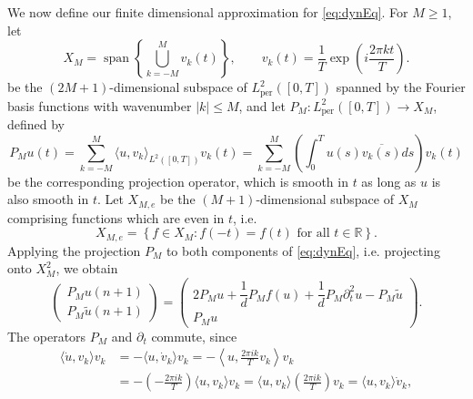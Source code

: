 \documentclass[12pt,reqno]{amsart}
\def\R{{\mathbb R}}
\def\per{\textrm{per}}
\DeclareMathOperator{\spn}{span}
\begin{document}
We now define our finite dimensional approximation for \cref{eq:dynEq}. For $M \geq 1$, let 
\begin{equation}\label{eq:XM}
X_M = \spn\left\{ \bigcup_{k = -M}^M v_k(t) \right\}, \qquad
v_k(t) = \frac{1}{T} \exp\left( i \frac{2 \pi k t}{T} \right).
\end{equation}
be the $(2M+1)$-dimensional subspace of $L_\per^2([0,T])$ spanned by the Fourier basis functions with wavenumber $|k| \leq M$, and let $P_M: L_\per^2([0,T]) \rightarrow X_M$, defined by
\begin{equation}\label{eq:PM}
P_M u(t) = \sum_{k=-M}^M \langle u, v_k \rangle_{L^2([0,T])} v_k(t)
= \sum_{k=-M}^M \left( \int_0^T u(s) \overline{v_k(s)} ds \right) v_k(t)
\end{equation}
be the corresponding projection operator, which is smooth in $t$ as long as $u$ is also smooth in $t$. Let $X_{M,e}$ be the $(M+1)$-dimensional subspace of $X_M$ comprising functions which are even in $t$, i.e.
\begin{equation}
X_{M,e} = \left\{ f \in X_M : f(-t) = f(t) \text{ for all }t \in \R \right\}.
\end{equation}
Applying the projection $P_M$ to both components of \cref{eq:dynEq}, i.e. projecting onto $X_M^2$, we obtain
\begin{equation}
\begin{pmatrix}P_M u(n+1) \\ P_M \tilde{u}(n+1) \end{pmatrix} = 
\begin{pmatrix}2 P_M u  + \dfrac{1}{d}P_M f(u) + \dfrac{1}{d} P_M \partial_t^2 u - P_M \tilde{u} \\
P_M u
\end{pmatrix}.
\end{equation}
The operators $P_M$ and $\partial_t$ commute, since 
\begin{align*}
\langle \dot{u}, v_k \rangle v_k &= -\langle u, \dot{v}_k \rangle v_k
= -\left\langle u, \frac{2 \pi i k}{T} v_k \right\rangle v_k \\
&= -\left( -\frac{2 \pi i k}{T} \right) \langle u, v_k \rangle v_k
= \langle u, v_k \rangle \left( \frac{2 \pi i k}{T} \right) v_k 
= \langle u, v_k \rangle \dot{v}_k,
\end{align*}
\end{document}
